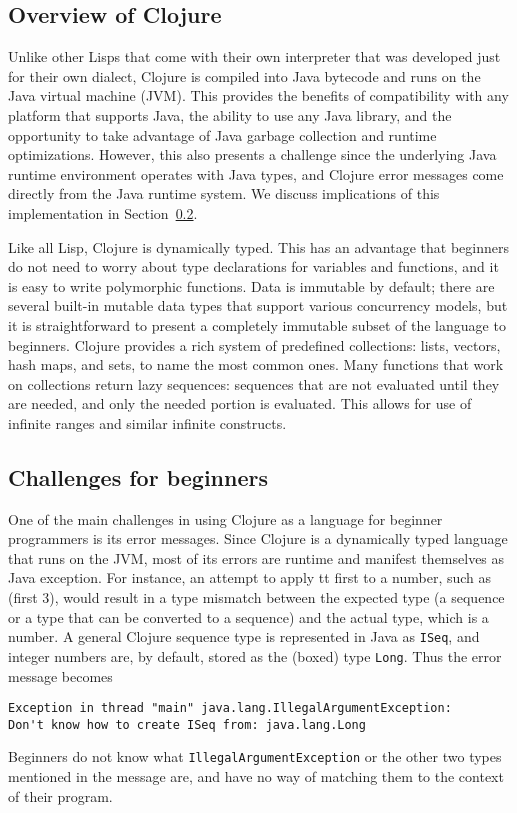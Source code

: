 \documentclass[submission,copyright,creativecommons]{eptcs}
\newcommand{\allcomments}[1]{{#1}}
\newcommand{\emcomment}[1]{{\bf \textcolor{ForestGreen}{\allcomments{{#1}}}}}
\begin{document}
\subsection{Overview of Clojure}\label{subsec:clojure}
%
Unlike other Lisps that come with their own interpreter that was developed just for their own dialect, Clojure is compiled 
into Java bytecode and runs on the Java virtual machine (JVM). This provides the benefits of compatibility with 
any platform that supports Java, the ability to use any Java library, and the opportunity to take advantage of Java 
garbage collection and runtime optimizations. However, this also presents a challenge since the underlying Java 
runtime environment operates with Java types, and Clojure error messages come directly from the Java runtime
system. We discuss implications of this implementation in Section~\ref{subsec:challenges}.

Like all Lisp, Clojure is dynamically typed. This has an advantage that beginners do not need to worry about type declarations
for variables and functions, and it is easy to write polymorphic functions. 
Data is immutable by default; there are several built-in mutable data types that support various concurrency models, 
but it is straightforward to present a completely immutable subset of the language to beginners. 
Clojure provides a rich system of predefined collections: lists, vectors, hash maps, and sets, to name the 
most common ones. Many functions that work on collections return lazy sequences: sequences that are not evaluated 
until they are needed, and only the needed portion is evaluated. This allows for use of infinite ranges and similar infinite 
constructs. 

\subsection{Challenges for beginners}\label{subsec:challenges}
One of the main challenges in using Clojure as a language for beginner programmers is its error messages. 
Since Clojure is a dynamically typed language that runs on the JVM, most of its errors
are runtime and manifest themselves as Java exception.
For instance, an attempt to apply {tt first} to a number, such as {(first 3)}, 
would result in a type mismatch between the expected type (a sequence or a type that can be converted to a sequence) 
and the actual type, which is a number. A general Clojure sequence type  is represented in Java as 
{\tt ISeq}, and integer numbers are, by default, stored as the (boxed) type {\tt Long}. Thus the error message becomes
\begin{verbatim}
Exception in thread "main" java.lang.IllegalArgumentException:
Don't know how to create ISeq from: java.lang.Long
\end{verbatim}
Beginners do not know what {\tt IllegalArgumentException} or the other two types mentioned in the message are, and have no
way of matching them to the context of their program. 
\end{document}
